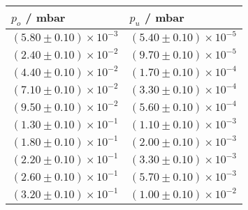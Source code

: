 \begin{tabular}{ll}
\toprule
                                $p_o$ / mbar &                                 $p_u$ / mbar \\
\midrule
 $\left(5.80 \pm 0.10\right) \times 10^{-3}$ &  $\left(5.40 \pm 0.10\right) \times 10^{-5}$ \\
 $\left(2.40 \pm 0.10\right) \times 10^{-2}$ &  $\left(9.70 \pm 0.10\right) \times 10^{-5}$ \\
 $\left(4.40 \pm 0.10\right) \times 10^{-2}$ &  $\left(1.70 \pm 0.10\right) \times 10^{-4}$ \\
 $\left(7.10 \pm 0.10\right) \times 10^{-2}$ &  $\left(3.30 \pm 0.10\right) \times 10^{-4}$ \\
 $\left(9.50 \pm 0.10\right) \times 10^{-2}$ &  $\left(5.60 \pm 0.10\right) \times 10^{-4}$ \\
 $\left(1.30 \pm 0.10\right) \times 10^{-1}$ &  $\left(1.10 \pm 0.10\right) \times 10^{-3}$ \\
 $\left(1.80 \pm 0.10\right) \times 10^{-1}$ &  $\left(2.00 \pm 0.10\right) \times 10^{-3}$ \\
 $\left(2.20 \pm 0.10\right) \times 10^{-1}$ &  $\left(3.30 \pm 0.10\right) \times 10^{-3}$ \\
 $\left(2.60 \pm 0.10\right) \times 10^{-1}$ &  $\left(5.70 \pm 0.10\right) \times 10^{-3}$ \\
 $\left(3.20 \pm 0.10\right) \times 10^{-1}$ &  $\left(1.00 \pm 0.10\right) \times 10^{-2}$ \\
\bottomrule
\end{tabular}
